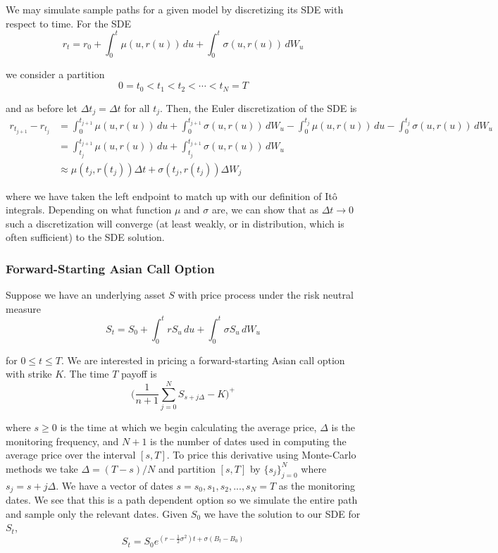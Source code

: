 \documentclass[12pt]{article}
\newlength\tindent
\renewcommand{\indent}{\hspace*{\tindent}}
\begin{document}
\indent We may simulate sample paths for a given model by discretizing its SDE with respect to time. For the SDE
\begin{equation*}
	r_t = r_0 + \int^t_0 \mu(u, r(u))\,du + \int^t_0 \sigma(u, r(u))\,dW_u
\end{equation*}

we consider a partition
\begin{equation*}
	0 = t_0 < t_1 < t_2 < \cdots < t_N = T
\end{equation*}

and as before let $\Delta t_j = \Delta t$ for all $t_j$. Then, the Euler discretization of the SDE is
\begin{align*}
	r_{t_{j+1}} - r_{t_j} &= \int^{t_{j+1}}_0 \mu(u, r(u))\,du + \int^{t_{j+1}}_0 \sigma(u, r(u))\,dW_u - \int^{t_{j}}_0 \mu(u, r(u))\,du - \int^{t_{j}}_0 \sigma(u, r(u))\,dW_u \\
	&= \int^{t_{j+1}}_{t_j} \mu(u, r(u))\,du + \int^{t_{j+1}}_{t_j} \sigma(u, r(u))\,dW_u \\
	&\approx \mu(t_j, r(t_j))\Delta t + \sigma(t_j, r(t_j))\Delta W_j
\end{align*}

where we have taken the left endpoint to match up with our definition of It\^{o} integrals. Depending on what function $\mu$ and $\sigma$ are, we can show that as $\Delta t \to 0$ such a discretization will converge (at least weakly, or in distribution, which is often sufficient) to the SDE solution.

\subsubsection{Forward-Starting Asian Call Option}

Suppose we have an underlying asset $S$ with price process under the risk neutral measure
\begin{equation*}
	S_t = S_0 + \int^t_0 rS_u\,du + \int^t_0 \sigma S_u\,dW_u
\end{equation*}

for $0 \leq t \leq T$. We are interested in pricing a forward-starting Asian call option with strike $K$. The time $T$ payoff is
\begin{equation*}
	\bigg(\frac{1}{n + 1} \sum^N_{j = 0} S_{s + j\Delta} - K\bigg)^+
\end{equation*}

where $s \geq 0$ is the time at which we begin calculating the average price, $\Delta$ is the monitoring frequency, and $N + 1$ is the number of dates used in computing the average price over the interval $[s, T]$. To price this derivative using Monte-Carlo methods we take $\Delta = (T - s)/N$ and partition $[s, T]$ by $\{s_j\}^N_{j=0}$ where $s_j = s + j\Delta$. We have a vector of dates $s = s_0, s_1, s_2, ..., s_N = T$ as the monitoring dates. We see that this is a path dependent option so we simulate the entire path and sample only the relevant dates. Given $S_0$ we have the solution to our SDE for $S_t$,
\begin{equation*}
	S_t = S_0 e^{(r - \frac{1}{2}\sigma^2)t + \sigma (B_t - B_0)}
\end{equation*}
\end{document}
